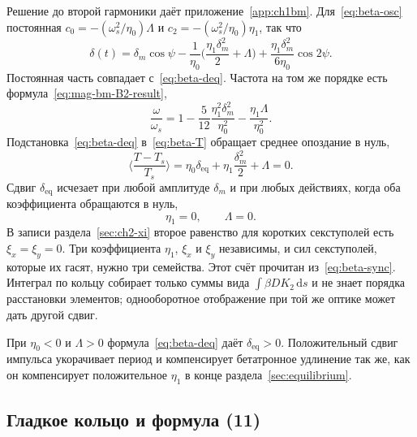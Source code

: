 \documentclass[aps,pra,preprint,a4paper,amsmath,amssymb,longbibliography]{revtex4-2}
\begin{document}
Решение до второй гармоники даёт приложение~\ref{app:ch1bm}. Для~\eqref{eq:beta-osc} постоянная $c_0=-(\omega_s^2/\eta_0)\Lambda$ и $c_2=-(\omega_s^2/\eta_0)\eta_1$, так что
\begin{equation}
\label{eq:beta-delta-sol}
\delta(t)
=\delta_m\cos\psi
-\frac{1}{\eta_0}
\Biggl(\frac{\eta_1\delta_m^2}{2}+\Lambda\Biggr)
+\frac{\eta_1\delta_m^2}{6\eta_0}\cos 2\psi.
\end{equation}
Постоянная часть совпадает с~\eqref{eq:beta-deq}. Частота на том же порядке есть формула~\eqref{eq:mag-bm-B2-result},
\begin{equation}
\label{eq:beta-freq}
\frac{\omega}{\omega_s}
=1-\frac{5}{12}\frac{\eta_1^2\delta_m^2}{\eta_0^2}
-\frac{\eta_1\Lambda}{\eta_0^2}.
\end{equation}
Подстановка~\eqref{eq:beta-deq} в~\eqref{eq:beta-T} обращает среднее опоздание в нуль,
\begin{equation}
\label{eq:beta-sync}
\Biggl\langle\frac{T-T_s}{T_s}\Biggr\rangle
=\eta_0\delta_{\mathrm{eq}}+\eta_1\frac{\delta_m^2}{2}+\Lambda
=0.
\end{equation}
Сдвиг $\delta_{\mathrm{eq}}$ исчезает при любой амплитуде $\delta_m$ и при любых действиях, когда оба коэффициента обращаются в нуль,
\begin{equation}
\label{eq:beta-comp}
\eta_1=0,
\qquad
\Lambda=0.
\end{equation}
В записи раздела~\ref{sec:ch2-xi} второе равенство для коротких секступолей есть $\xi_x=\xi_y=0$. Три коэффициента $\eta_1$, $\xi_x$ и $\xi_y$ независимы, и сил секступолей, которые их гасят, нужно три семейства. Этот счёт прочитан из~\eqref{eq:beta-sync}. Интеграл по кольцу собирает только суммы вида $\int\beta DK_2\,\mathrm{d}s$ и не знает порядка расстановки элементов; однооборотное отображение при той же оптике может дать другой сдвиг.

При $\eta_0<0$ и $\Lambda>0$ формула~\eqref{eq:beta-deq} даёт $\delta_{\mathrm{eq}}>0$. Положительный сдвиг импульса укорачивает период и компенсирует бетатронное удлинение так же, как он компенсирует положительное $\eta_1$ в конце раздела~\ref{sec:equilibrium}.

\subsection{Гладкое кольцо и формула (11)}
\label{sec:ch2-smooth}
\end{document}
